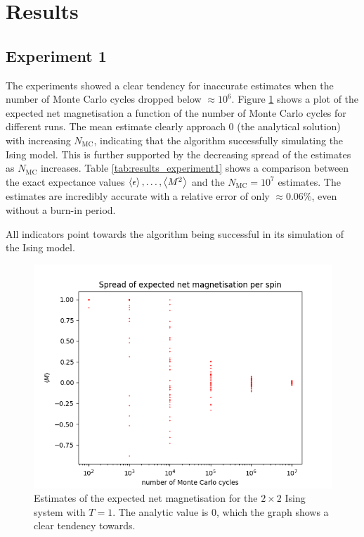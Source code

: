 \documentclass[nofootinbib,reprint,english]{revtex4-1}
\begin{document}
\section{Results}
\subsection{Experiment 1}
The experiments showed a clear tendency for inaccurate estimates when the number of Monte Carlo cycles dropped below \(\approx10^6\). Figure \ref{fig:2by2_expected_netmagnetisation} shows a plot of the expected net magnetisation a function of the number of Monte Carlo cycles for different runs. The mean estimate clearly approach 0 (the analytical solution) with increasing \(N_\text{MC}\), indicating that the algorithm successfully simulating the Ising model. This is further supported by the decreasing spread of the estimates as \(N_\text{MC}\) increases. Table \ref{tab:results_experiment1} shows a comparison between the exact expectance values \(\expval{\epsilon},\ldots,\expval{M^2}\) and the \(N_\text{MC}=10^7\) estimates. The estimates are incredibly accurate with a relative error of only \(\approx0.06\)\%, even without a burn-in period.

All indicators point towards the algorithm being successful in its simulation of the Ising model.

\begin{figure}[hb]
\centering
\includegraphics[scale=0.5]{../output/figures/experiment1/netmagnetisation.png}
\caption{Estimates of the expected net magnetisation for the \(2\times2\) Ising system with \(T=1\). The analytic value is 0, which the graph shows a clear tendency towards.}\label{fig:2by2_expected_netmagnetisation}
\end{figure}
\end{document}
